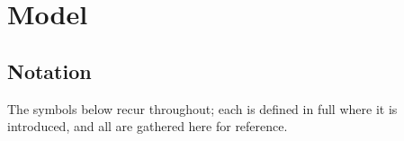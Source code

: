 \section{Model}
\label{sec:model}

\subsection*{Notation}

\noindent The symbols below recur throughout; each is defined in full where it is
introduced, and all are gathered here for reference.

\vspace{4pt}


